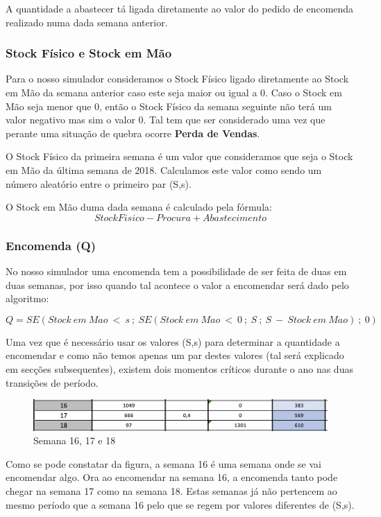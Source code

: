\documentclass[a4paper]{article}
\begin{document}
A quantidade a abastecer tá ligada diretamente ao valor do pedido de encomenda realizado numa dada semana anterior.


\subsubsection{Stock Físico e Stock em Mão}

Para o nosso simulador consideramos o Stock Físico ligado diretamente ao Stock em Mão da semana anterior caso este seja maior ou igual a 0. Caso o Stock em Mão seja menor que 0, então o Stock Físico da semana seguinte não terá um valor negativo mas sim o valor 0. Tal tem que ser considerado uma vez que perante uma situação de quebra ocorre \textbf{Perda de Vendas}.

O Stock Físico da primeira semana é um valor que consideramos que seja o Stock em Mão da última semana de 2018. Calculamos este valor como sendo um número aleatório entre o primeiro par (S,s).

O Stock em Mão duma dada semana é calculado pela fórmula: $$ StockFisico - Procura + Abastecimento $$


\subsubsection{Encomenda (Q)}

No nosso simulador uma encomenda tem a possibilidade de ser feita de duas em duas semanas, por isso quando tal acontece o valor a encomendar será dado pelo algoritmo:

 $$ Q = SE(Stock\ em\ Mao\ <\ s\ ;\ SE(Stock\ em\ Mao\ <\ 0\ ;\ S\ ;\ S\ -\ Stock\ em\ Mao)\ ;\ 0 ) $$

 Uma vez que é necessário usar os valores (S,s) para determinar a quantidade a encomendar e como não temos apenas um par destes valores (tal será explicado em secções subsequentes), existem dois momentos críticos durante o ano nas duas transições de período.

\begin{figure}[H]
\centering
\includegraphics[scale=0.6]{periodo_critico.png}
\caption{Semana 16, 17 e 18}
\label{img:periodo_critico}
\end{figure}

Como se pode constatar da figura, a semana 16 é uma semana onde se vai encomendar algo. Ora ao encomendar na semana 16, a encomenda tanto pode chegar na semana 17 como na semana 18. Estas semanas já não pertencem ao mesmo período que a semana 16 pelo que se regem por valores diferentes de (S,s).
\end{document}
